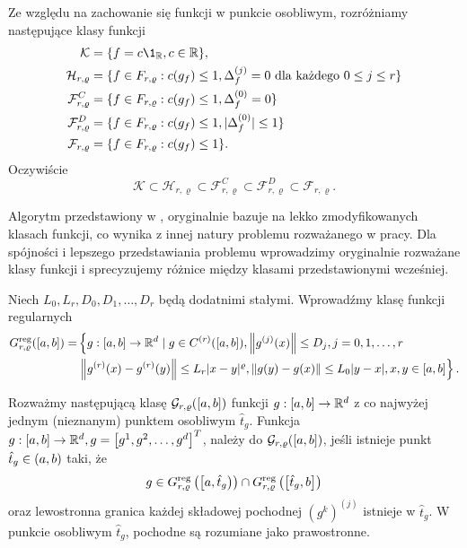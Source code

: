\documentclass[oik, pdftex, man]{mgrwms}
\begin{document}
    Ze względu na zachowanie się funkcji w punkcie osobliwym, rozróżniamy następujące klasy funkcji
    \begin{equation*}
        \begin{split}
            \mathcal{K} & = \{f = c \1_{\R}, c \in \R \}, \\
            \mathcal{H}_{r, \varrho} & = \{ f \in F_{r, \varrho}: c(g_{f}) \leq 1, \Delta_{f}^{(j)} = 0 \text{ dla każdego } 0 \leq j \leq r\} \\
            \mathcal{F}_{r, \varrho}^{C} & = \{ f \in F_{r, \varrho}: c(g_{f}) \leq 1, \Delta_{f}^{(0)} = 0 \} \\
            \mathcal{F}_{r, \varrho}^{D} & = \{ f \in F_{r, \varrho}: c(g_{f}) \leq 1, | \Delta_{f}^{(0)} | \leq 1 \} \\
            \mathcal{F}_{r, \varrho} & = \{ f \in F_{r, \varrho}: c(g_{f}) \leq 1 \}. \\
        \end{split}
    \end{equation*}
    Oczywiście
    \begin{equation*}
        \mathcal{K} \subset \mathcal{H}_{r, \varrho} \subset \mathcal{F}_{r, \varrho}^{C} \subset \mathcal{F}_{r, \varrho}^{D} \subset \mathcal{F}_{r, \varrho}.
    \end{equation*}


    Algorytm przedstawiony w  \cite{CoDF}, oryginalnie bazuje na lekko zmodyfikowanych klasach funkcji, co wynika z innej natury problemu rozważanego w pracy. Dla spójności i lepszego przedstawiania problemu wprowadzimy oryginalnie rozważane klasy funkcji i sprecyzujemy różnice między klasami przedstawionymi wcześniej.

    Niech $L_{0}, L_{r}, D_{0}, D_{1}, \ldots, D_{r}$ będą dodatnimi stałymi. Wprowadźmy klasę funkcji regularnych
    \begin{equation*}
        \begin{aligned}
        G_{r, \varrho}^{\mathrm{reg}}([a, b])= &\left\{g:[a, b] \rightarrow \mathbb{R}^{d} \mid g \in C^{(r)}([a, b]),\left\|g^{(j)}(x)\right\| \leq D_{j}, j=0,1, \ldots, r\right. \\
                                      &\left.\left\|g^{(r)}(x)-g^{(r)}(y)\right\| \leq L_{r}|x-y|^{\varrho},\|g(y)-g(x)\| \leq L_{0}|y-x|, x,y \in [a, b]\right\}.
        \end{aligned}
    \end{equation*}

    Rozważmy następującą klasę $\mathcal{G}_{r,\varrho}([a, b])$ funkcji $g:[a, b] \rightarrow \mathbb{R}^{d}$ z co najwyżej jednym (nieznanym) punktem osobliwym $\hat{t}_{g}$. Funkcja $g:[a, b] \rightarrow \mathbb{R}^{d}, g=\left[g^{1}, g^{2}, \ldots, g^{d}\right]^{T}$, należy do $\mathcal{G}_{r,\varrho}([a, b])$, jeśli istnieje punkt $\hat{t}_{g} \in (a, b)$ taki, że 
    \begin{equation*}
        g \in G_{r, \varrho}^{\mathrm{reg}}\left(\left[a, \hat{t}_{g}\right)\right) \cap G_{r, \varrho}^{\mathrm{reg}}\left(\left[\hat{t}_{g}, b\right]\right)    
    \end{equation*}
    oraz lewostronna granica każdej składowej pochodnej $\left(g^{k}\right)^{(j)}$ istnieje w $\hat{t}_{g}$. W punkcie osobliwym $\hat{t}_{g}$, pochodne są rozumiane jako prawostronne.
    
\end{document}
